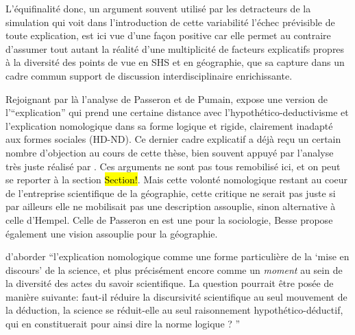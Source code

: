 L'équifinalité donc, un argument souvent utilisé par les detracteurs de la simulation qui voit dans l'introduction de cette variabilité l'échec prévisible de toute explication, est ici vue d'une façon positive car elle permet au contraire d'assumer tout autant la réalité d'une multiplicité de facteurs explicatifs propres à la diversité des points de vue en SHS et en géographie, que sa capture dans un cadre commun support de discussion interdisciplinaire enrichissante. 

Rejoignant par là l'analyse de Passeron et de Pumain, \textcite{Besse2000} expose une version de l'\enquote{explication} qui prend une certaine distance avec l'hypothético-deductivisme et l'explication nomologique dans sa forme logique et rigide, clairement inadapté aux formes sociales (HD-ND). Ce dernier cadre explicatif a déjà reçu un certain nombre d'objection au cours de cette thèse, bien souvent appuyé par l'analyse très juste réalisé par \textcite{Besse2000}. Ces arguments ne sont pas tous remobilisé ici, et on peut se reporter à la section \hl{Section!}. Mais cette volonté nomologique restant au coeur de l'entreprise scientifique de la géographie, cette critique ne serait pas juste si par ailleurs elle ne mobilisait pas une description assouplie, sinon alternative à celle d'Hempel. Celle de Passeron en est une pour la sociologie, Besse propose également une vision assouplie pour la géographie.

\textcite{Besse2000} d'aborder \enquote{l'explication nomologique comme une forme particulière de la \enquote{mise en discours} de la science, et plus précisément encore comme un \textit{moment} au sein de la diversité des actes du savoir scientifique. La question pourrait être posée de manière suivante: faut-il réduire la discursivité scientifique au seul mouvement de la déduction, la science se réduit-elle au seul raisonnement hypothético-déductif, qui en constituerait pour ainsi dire la norme logique ? }
 
